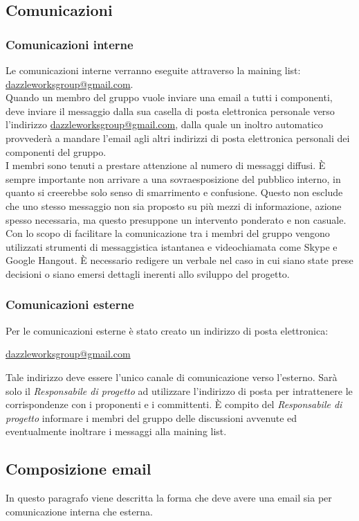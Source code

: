 	\subsection{Comunicazioni}
		\subsubsection{Comunicazioni interne}
Le comunicazioni interne verranno eseguite attraverso la \gls{maining list}: \url{dazzleworksgroup@gmail.com}. \\ 
Quando un membro del gruppo vuole inviare una email a tutti i componenti, deve inviare il messaggio dalla sua casella di posta elettronica personale verso l'indirizzo \url{dazzleworksgroup@gmail.com}, dalla quale un inoltro automatico provvederà a mandare l'email agli altri indirizzi di posta elettronica personali dei componenti del gruppo.\\ 
I membri sono tenuti a prestare attenzione al numero di messaggi diffusi. È sempre importante non arrivare a una sovraesposizione del pubblico interno, in quanto si creerebbe solo senso di smarrimento e confusione. Questo non esclude che uno stesso messaggio non sia proposto su più mezzi di informazione, azione spesso necessaria, ma questo presuppone un intervento ponderato e non casuale.\\
Con lo scopo di facilitare la comunicazione tra i membri del gruppo vengono utilizzati strumenti di messaggistica istantanea e videochiamata come Skype e Google Hangout.
È necessario redigere un \gls{verbale} nel caso in cui siano state prese decisioni o siano emersi dettagli inerenti allo sviluppo del progetto. 
		\subsubsection{Comunicazioni esterne}
Per le comunicazioni esterne è stato creato un indirizzo di posta elettronica:
\begin{center}
\url{dazzleworksgroup@gmail.com}
\end{center}
Tale indirizzo deve essere l'unico canale di comunicazione verso l'esterno. Sarà solo il \textit{Responsabile di progetto} ad utilizzare l'indirizzo di posta per intrattenere le corrispondenze con i proponenti e i committenti. È compito del \textit{Responsabile di progetto} informare i membri del gruppo delle discussioni avvenute ed eventualmente inoltrare i messaggi alla \gls{maining list}.

	\subsection{Composizione email}
In questo paragrafo viene descritta la forma che deve avere una email sia per comunicazione interna che esterna.
